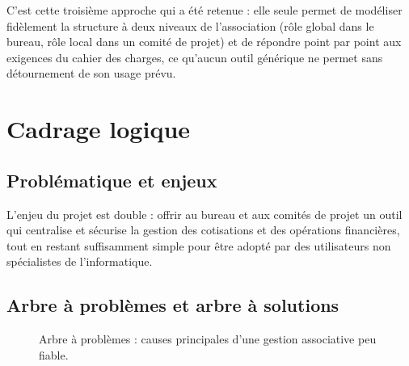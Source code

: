 C'est cette troisième approche qui a été retenue : elle seule permet de
modéliser fidèlement la structure à deux niveaux de l'association (rôle
global dans le bureau, rôle local dans un comité de projet) et de répondre
point par point aux exigences du cahier des charges, ce qu'aucun outil
générique ne permet sans détournement de son usage prévu.

\section{Cadrage logique}

\subsection{Problématique et enjeux}

L'enjeu du projet est double : offrir au bureau et aux comités de projet un
outil qui centralise et sécurise la gestion des cotisations et des
opérations financières, tout en restant suffisamment simple pour être adopté
par des utilisateurs non spécialistes de l'informatique.

\subsection{Arbre à problèmes et arbre à solutions}

\begin{figure}[H]
  \centering
  \caption{Arbre à problèmes : causes principales d'une gestion associative peu fiable.}
  \label{fig:arbre-problemes}
\end{figure}

